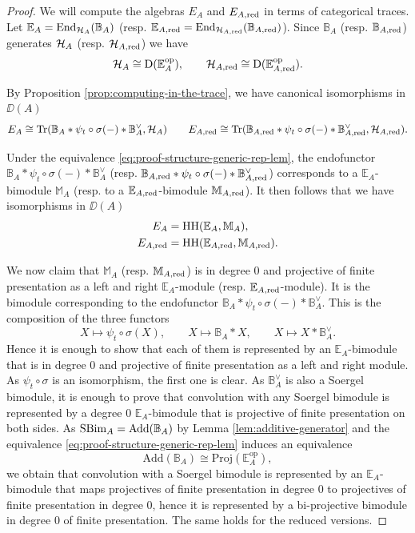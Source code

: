 \documentclass[a4paper, 10pt, oneside, reqno]{amsart}
\theoremstyle{plain}
\theoremstyle{definition}
\theoremstyle{remark}
\newcommand{\opp}{\mathrm{op}}
\newcommand{\HHH}{\mathrm{HH}}
\newcommand{\Add}{\mathrm{Add}}
\newcommand{\EE}{\mathbb{E}}
\newcommand{\Mbb}{\mathbb{M}}
\newcommand{\Proj}{\mathrm{Proj}}
\begin{document}
\begin{proof}
We will compute the algebras $E_A$ and $E_{A,\mathrm{red}}$ in terms of categorical traces. Let $\EE_A = \End_{\Hcal_A}(\mathbb{B}_A)$ (resp. $\EE_{A,\red} = \End_{\Hcal_{A,\red}}(\mathbb{B}_{A,\red})$). Since $\mathbb{B}_A$ (resp. $\mathbb{B}_{A, \mathrm{red}}$) generates $\mathcal{H}_A$ (resp. $\mathcal{H}_{A,\mathrm{red}}$) we have 
\begin{equation}\label{eq:proof-structure-generic-rep-lem}
\Hcal_A \cong \DD(\EE_A^{\opp}), \qquad \Hcal_{A, \red} \cong \DD(\EE_{A, \red}^{\opp}).
\end{equation}

By Proposition \ref{prop:computing-in-the-trace}, we have canonical isomorphisms in $\DD(A)$ 
$$E_A \cong \mathrm{Tr}(\mathbb{B}_A * \psi_t \circ \sigma (-) * \mathbb{B}_{A}^{\vee}, \mathcal{H}_A) \qquad E_{A,\mathrm{red}} \cong \mathrm{Tr}(\mathbb{B}_{A,\mathrm{red}} * \psi_t \circ \sigma (-) * \mathbb{B}_{A,\mathrm{red}}^{\vee}, \mathcal{H}_{A,\mathrm{red}}).$$

Under the equivalence \eqref{eq:proof-structure-generic-rep-lem}, the endofunctor $\mathbb{B}_A * \psi_t \circ \sigma (-) * \mathbb{B}_{A}^{\vee}$ (resp. $\mathbb{B}_{A,\mathrm{red}} * \psi_t \circ \sigma (-) * \mathbb{B}_{A,\mathrm{red}}^{\vee}$) corresponds to a $\EE_A$-bimodule $\Mbb_A$ (resp. to a $\EE_{A, \red}$-bimodule $\Mbb_{A,\red}$). It then follows that we have isomorphisms in $\DD(A)$ 
\begin{align*}
E_A &= \HHH(\EE_A, \Mbb_A), \\
E_{A,\red} &= \HHH(\EE_{A, \red}, \Mbb_{A,\red}).
\end{align*}

We now claim that $\Mbb_A$ (resp. $\Mbb_{A, \red}$) is in degree $0$ and projective of finite presentation as a left and right $\EE_A$-module (resp. $\EE_{A,\red}$-module). It is the bimodule corresponding to the endofunctor $\mathbb{B}_A * \psi_t \circ \sigma (-) * \mathbb{B}_{A}^{\vee}$. This is the composition of the three functors 
$$X \mapsto \psi_t \circ \sigma(X), \qquad X \mapsto \mathbb{B}_A * X, \qquad X \mapsto X *\mathbb{B}_A^{\vee}.$$
Hence it is enough to show that each of them is represented by an $\EE_A$-bimodule that is in degree $0$ and projective of finite presentation as a left and right module. As $\psi_t \circ \sigma$ is an isomorphism, the first one is clear. As $\mathbb{B}_A^{\vee}$ is also a Soergel bimodule, it is enough to prove that convolution with any Soergel bimodule is represented by a degree $0$ $\EE_A$-bimodule that is projective of finite presentation on both sides. As $\SBim_A = \Add(\mathbb{B}_A)$ by Lemma \ref{lem:additive-generator} and the equivalence \eqref{eq:proof-structure-generic-rep-lem} induces an equivalence
$$\Add(\mathbb{B}_A) \cong \Proj(\EE_A^{\opp}),$$
we obtain that convolution with a Soergel bimodule is represented by an $\EE_A$-bimodule that maps projectives of finite presentation in degree $0$ to projectives of finite presentation in degree $0$, hence it is represented by a bi-projective bimodule in degree $0$ of finite presentation. The same holds for the reduced versions. 


\end{proof}
\end{document}
